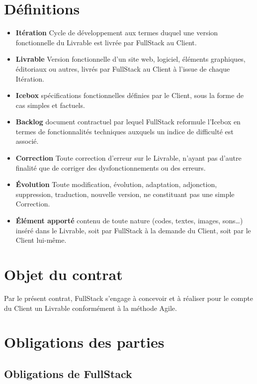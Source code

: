 \documentclass[11pt]{article}
\begin{document}
\section{Définitions}

\begin{itemize}
  \item \textbf{Itération} Cycle de développement aux termes duquel une version fonctionnelle du Livrable est livrée par FullStack au Client.
  \item \textbf{Livrable} Version fonctionnelle d’un site web, logiciel, éléments graphiques, éditoriaux ou autres, livrés par FullStack au Client à l’issue de chaque Itération.
  \item \textbf{Icebox} spécifications fonctionnelles définies par le Client, sous la forme de cas simples et factuels.
  \item \textbf{Backlog} document contractuel par lequel FullStack reformule l’Icebox en termes de fonctionnalités techniques auxquels un indice de difficulté est associé.
  \item \textbf{Correction} Toute correction d’erreur sur le Livrable, n’ayant pas d’autre finalité que de corriger des dysfonctionnements ou des erreurs.
  \item \textbf{Évolution} Toute modification, évolution, adaptation, adjonction, suppression, traduction, nouvelle version, ne constituant pas une simple Correction.
  \item \textbf{Élément apporté} contenu de toute nature (codes, textes, images, sons…) inséré dans le Livrable, soit par FullStack à la demande du Client, soit par le Client lui-même.
\end{itemize}


\section{Objet du contrat}

Par le présent contrat, FullStack s’engage à concevoir et à réaliser pour le compte du Client un Livrable conformément à la méthode Agile.

\section{Obligations des parties}

\subsection{Obligations de FullStack}
\end{document}
